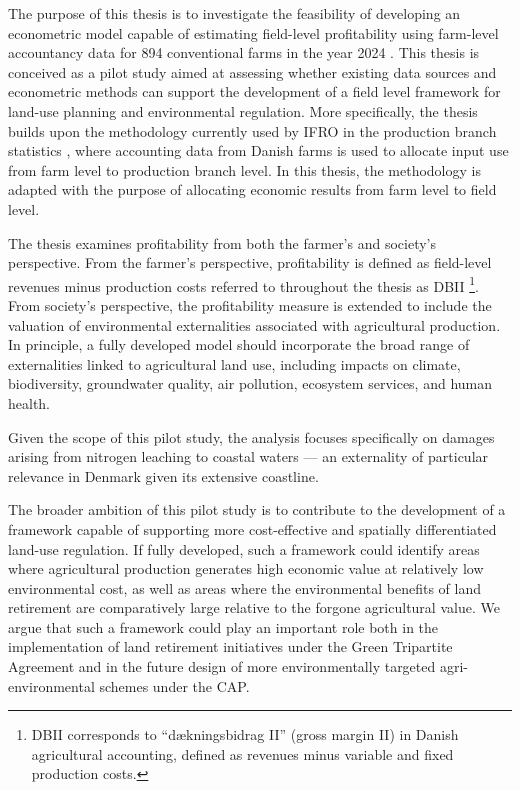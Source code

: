 \documentclass[12pt]{article}
\begin{document}
The purpose of this thesis is to investigate the feasibility of developing an econometric model capable of estimating field-level profitability using 
farm-level accountancy data for 894 conventional farms 
in the year 2024 \citep{seges2025}. This thesis is conceived as a pilot study aimed at assessing whether existing data sources and econometric methods can support the development of a field level framework for land-use planning and environmental regulation.
More specifically, the thesis builds upon the methodology currently used by IFRO in the production branch statistics \citep{dst2025a,henningsen2026}, where accounting data from Danish farms is used to allocate input use from farm level to production branch level. 
In this thesis, the methodology is adapted with the purpose of allocating economic results from farm level to field level. 

The thesis examines profitability from both the farmer's and society's perspective. 
From the farmer's perspective, profitability is defined as field-level revenues minus production costs referred to throughout the thesis as DBII \footnote{DBII corresponds to “dækningsbidrag II” (gross margin II) in Danish agricultural accounting, defined as revenues minus variable and fixed production costs.}. From society's perspective, the profitability measure is extended to include the valuation of environmental externalities associated with agricultural production.
In principle, a fully developed model should incorporate the broad range of externalities linked to agricultural land use, including impacts on climate, biodiversity, groundwater quality, air pollution, ecosystem services, and human health. 

Given the scope of this pilot study, the analysis focuses specifically on damages arising from nitrogen leaching to coastal waters --- an externality of particular relevance in Denmark given its extensive coastline.

The broader ambition of this pilot study is to contribute to the development of a framework capable of supporting more cost-effective and spatially differentiated land-use regulation. If fully developed, such a framework could identify areas where agricultural production generates high economic value at relatively low environmental cost, as well as areas where the environmental benefits of land retirement are comparatively large relative to the forgone agricultural value. 
We argue that such a framework could play an important role both in the implementation of land retirement initiatives under the Green Tripartite Agreement and in the future design of more environmentally targeted agri-environmental schemes under the CAP. 
\end{document}
